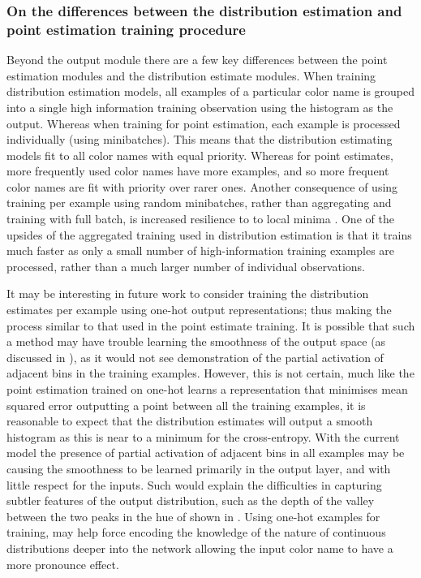 \documentclass[11pt,a4paper]{article}
\begin{document}
\subsubsection{On the differences between the distribution estimation and point estimation training procedure}

Beyond the output module there are a few key differences between the point estimation modules and the distribution estimate modules.
When training distribution estimation models, all examples of a particular color name is grouped into a single high information training observation using the histogram as the output.
Whereas when training for point estimation, each example is processed individually (using minibatches).
This means that the distribution estimating models fit to all color names with equal priority.
Whereas for point estimates, more frequently used color names have more examples, and so more frequent color names are fit with priority over rarer ones.
Another consequence of using training per example using random minibatches, rather than aggregating and training with full batch, is increased resilience to to local minima \parencite{lecun2012efficient}.
One of the upsides of the aggregated training used in distribution estimation is that it trains much faster as only a small number of high-information training examples are processed, rather than a much larger number of individual observations.


It may be interesting in future work to consider training the distribution estimates per example using one-hot output representations; thus making the process similar to that used in the point estimate training.
It is  possible that such a method may have trouble learning the smoothness of the output space (as discussed in ),
as it would not see demonstration of the partial activation of adjacent bins in the training examples.
However, this is not certain,  much like the point estimation trained on one-hot learns a representation that minimises mean squared error outputting  a point  between  all the training examples, it is reasonable to  expect that the distribution estimates will output a smooth histogram  as  this is near to a minimum for the cross-entropy.
With the current model the presence of partial activation of adjacent bins in all examples  may be causing the smoothness to  be learned primarily in the output layer, and with little respect for the inputs.
Such would explain the difficulties in capturing subtler features of the output distribution, such as the depth of the valley between the two peaks in the hue of  shown in .
Using one-hot examples for training, may help force encoding the knowledge of the nature of continuous distributions deeper into the network allowing the input color name to have a more pronounce effect.
\end{document}
